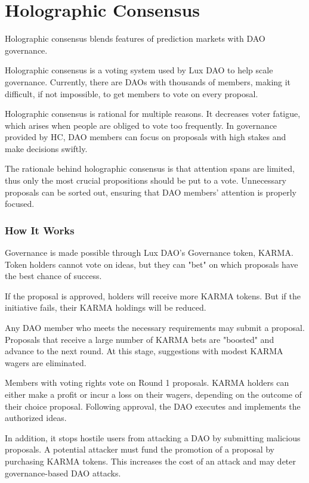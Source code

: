 \documentclass[11pt]{article}
\begin{document}
\section{Holographic Consensus}

Holographic consensus blends features of prediction markets with DAO governance.


Holographic consensus is a voting system used by Lux DAO to help scale governance. Currently, there are DAOs with thousands of members, making it difficult, if not impossible, to get members to vote on every proposal.


Holographic consensus is rational for multiple reasons. It decreases voter fatigue, which arises when people are obliged to vote too frequently. In governance provided by HC, DAO members can focus on proposals with high stakes and make decisions swiftly.


The rationale behind holographic consensus is that attention spans are limited, thus only the most crucial propositions should be put to a vote. Unnecessary proposals can be sorted out, ensuring that DAO members' attention is properly focused.


\subsubsection{How It Works}

Governance is made possible through Lux DAO's Governance token, KARMA. Token holders cannot vote on ideas, but they can "bet" on which proposals have the best chance of success.


If the proposal is approved, holders will receive more KARMA tokens. But if the initiative fails, their KARMA holdings will be reduced.


Any DAO member who meets the necessary requirements may submit a proposal. Proposals that receive a large number of KARMA bets are "boosted" and advance to the next round. At this stage, suggestions with modest KARMA wagers are eliminated.


Members with voting rights vote on Round 1 proposals. KARMA holders can either make a profit or incur a loss on their wagers, depending on the outcome of their choice proposal. Following approval, the DAO executes and implements the authorized ideas.


In addition, it stops hostile users from attacking a DAO by submitting malicious proposals. A potential attacker must fund the promotion of a proposal by purchasing KARMA tokens. This increases the cost of an attack and may deter governance-based DAO attacks.
\end{document}
